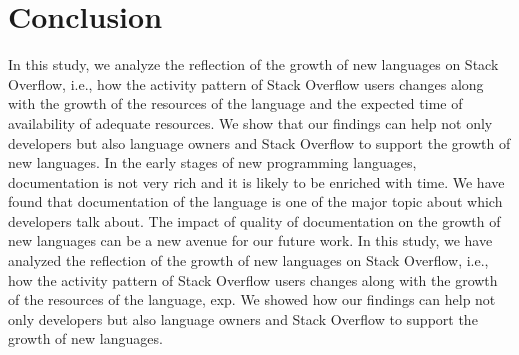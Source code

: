 \section{Conclusion}
\label{sec:conclusion}
In this study, we analyze the reflection of the growth of new languages on Stack Overflow, i.e., how the activity pattern of Stack Overflow users changes along with the growth of the resources of the language and the expected time of availability of adequate resources. We show that our findings can help not only developers but also language owners and Stack Overflow to support the growth of new languages. In the early stages of new programming languages, documentation is not very rich and it is likely to be enriched with time.  We have found that documentation of the language is one of the major topic about which  developers talk about. The impact of quality of documentation on the growth of new languages can be a new avenue for our future work. In this study, we have analyzed the reflection of the growth of new languages on Stack Overflow, i.e., how the activity pattern of Stack Overflow users changes along with the growth of the resources of the language, exp. We showed how our findings can help not only developers but also language owners and  Stack Overflow to support the growth of new languages. 


